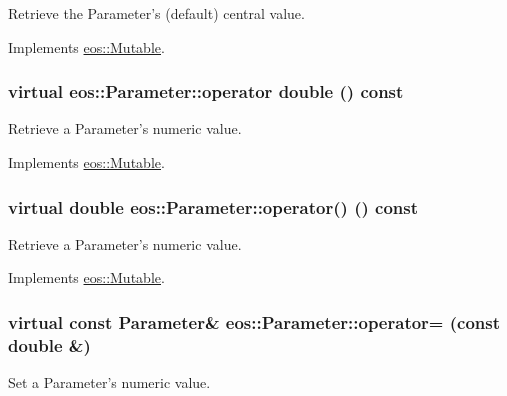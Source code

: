 Retrieve the Parameter's (default) central value. 

Implements \hyperlink{classeos_1_1Mutable_ad215a3863435593930a3543866881f49}{eos::Mutable}.\hypertarget{classeos_1_1Parameter_ad2dc69fe74e308328dc8a1d901c916ec}{
\subsubsection[{operator double}]{\setlength{\rightskip}{0pt plus 5cm}virtual eos::Parameter::operator double () const}}
\label{classeos_1_1Parameter_ad2dc69fe74e308328dc8a1d901c916ec}


Retrieve a Parameter's numeric value. 

Implements \hyperlink{classeos_1_1Mutable_a0763bf2933503db18d28b942aae2d324}{eos::Mutable}.\hypertarget{classeos_1_1Parameter_ada58e0206d67777a79bdd2bc0c806600}{
\subsubsection[{operator()}]{\setlength{\rightskip}{0pt plus 5cm}virtual double eos::Parameter::operator() () const}}
\label{classeos_1_1Parameter_ada58e0206d67777a79bdd2bc0c806600}


Retrieve a Parameter's numeric value. 

Implements \hyperlink{classeos_1_1Mutable_a6efd15ab0164a1735813669506e331d7}{eos::Mutable}.\hypertarget{classeos_1_1Parameter_aff29f9acdc90019e76239f6c81b4014a}{
\subsubsection[{operator=}]{\setlength{\rightskip}{0pt plus 5cm}virtual const {\bf Parameter}\& eos::Parameter::operator= (const double \&)}}
\label{classeos_1_1Parameter_aff29f9acdc90019e76239f6c81b4014a}


Set a Parameter's numeric value. 

